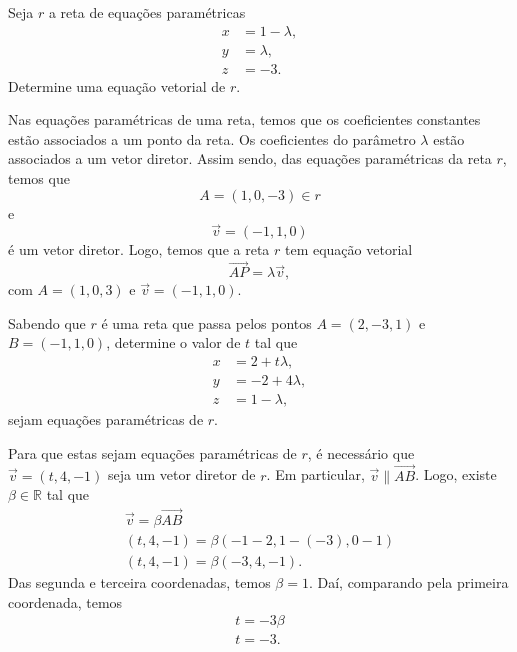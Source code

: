 \begin{exeresol}
  Seja $r$ a reta de equações paramétricas
  \begin{align}
    x &= 1 -\lambda,\\
    y &= \lambda,\\
    z &= -3.
  \end{align}
  Determine uma equação vetorial de $r$.
\end{exeresol}
\begin{resol}
  Nas equações paramétricas de uma reta, temos que os coeficientes constantes estão associados a um ponto da reta. Os coeficientes do parâmetro $\lambda$ estão associados a um vetor diretor. Assim sendo, das equações paramétricas da reta $r$, temos que
  \begin{equation}
    A = (1,0,-3)\in r
  \end{equation}
  e
  \begin{equation}
    \vec{v} = (-1,1,0)
  \end{equation}
  é um vetor diretor. Logo, temos que a reta $r$ tem equação vetorial
  \begin{equation}
    \overrightarrow{AP} = \lambda\vec{v},
  \end{equation}
  com $A = (1,0,3)$ e $\vec{v} = (-1,1,0)$.
\end{resol}

\begin{exeresol}
  Sabendo que $r$ é uma reta que passa pelos pontos $A = (2,-3,1)$ e $B = (-1,1,0)$, determine o valor de $t$ tal que
  \begin{align}
    x &= 2 + t\lambda,\\
    y &= -2 + 4\lambda,\\
    z &= 1 -\lambda,
  \end{align}
  sejam equações paramétricas de $r$.
\end{exeresol}
\begin{resol}
  Para que estas sejam equações paramétricas de $r$, é necessário que $\vec{v} = (t,4,-1)$ seja um vetor diretor de $r$. Em particular, $\vec{v} \parallel \overrightarrow{AB}$. Logo, existe $\beta\in\mathbb{R}$ tal que
  \begin{gather}
    \vec{v} = \beta\overrightarrow{AB}\\
    (t,4,-1) = \beta (-1-2,1-(-3),0-1) \\
    (t,4,-1) = \beta (-3,4,-1).
  \end{gather}
  Das segunda e terceira coordenadas, temos $\beta = 1$. Daí, comparando pela primeira coordenada, temos
  \begin{gather}
    t = -3\beta\\
    t = -3.
  \end{gather}
\end{resol}

